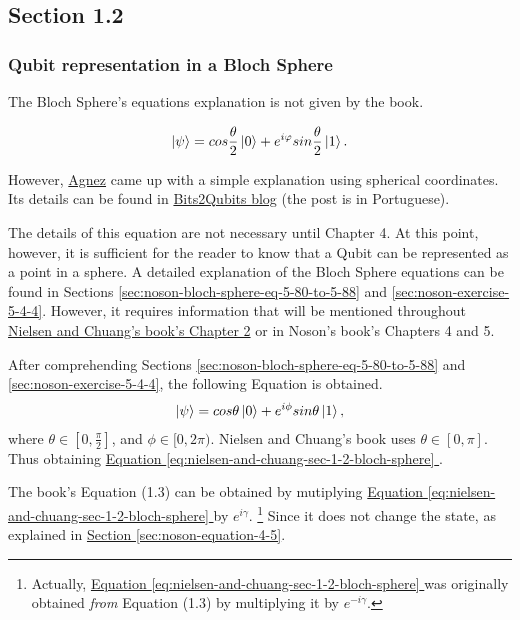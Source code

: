 \subsection{Section 1.2}
\subsubsection{Qubit representation in a Bloch Sphere}
\label{nielsen-and-chuang-qubit-representation-in-a-bloch-sphere}

The Bloch Sphere's equations explanation is not given by the book.

\begin{align}
\ket{\psi} = 
    cos \frac{\theta}{2}\ket{0} + e^{i \varphi} sin \frac{\theta}{2} \ket{1} .
    \label{eq:nielsen-and-chuang-sec-1-2-bloch-sphere}
\end{align}

However, \href{https://github.com/victoragnez}{Agnez} came up with a simple explanation using spherical coordinates.
Its details can be found in
\href{https://bits2qubits.blogspot.com/2018/09/representacao-de-qubits-na-esfera-de.html}{Bits2Qubits blog}
(the post is in Portuguese).

The details of this equation are not necessary until Chapter 4.
At this point, however, it is sufficient for the reader to know that
a Qubit can be represented as a point in a sphere.
A detailed explanation of the Bloch Sphere equations can be found in Sections
\hyperref[sec:noson-bloch-sphere-eq-5-80-to-5-88]{ \ref{sec:noson-bloch-sphere-eq-5-80-to-5-88}} and
\hyperref[sec:noson-exercise-5-4-4]{\ref{sec:noson-exercise-5-4-4}}.
However, it requires information that will be mentioned throughout
\hyperref[sec:nielsen-and-chuang-chapter-2]{Nielsen and Chuang's book's Chapter 2}
or in Noson's book's Chapters 4 and 5.

After comprehending Sections
\hyperref[sec:noson-bloch-sphere-eq-5-80-to-5-88]{ \ref{sec:noson-bloch-sphere-eq-5-80-to-5-88}} and
\hyperref[sec:noson-exercise-5-4-4]{\ref{sec:noson-exercise-5-4-4}},
the following Equation is obtained.
\begin{align}
    \ket\psi = cos\theta \ket0 + e^{i\phi} sin\theta \ket1,
\end{align}
where $\theta \in [0, \frac \pi 2]$, and $\phi \in [0, 2\pi)$.
Nielsen and Chuang's book uses $\theta \in [0, \pi]$.
Thus obtaining \hyperref[eq:nielsen-and-chuang-sec-1-2-bloch-sphere]{
    Equation \ref{eq:nielsen-and-chuang-sec-1-2-bloch-sphere}
}.

The book's Equation (1.3) can be obtained by mutiplying \hyperref[eq:nielsen-and-chuang-sec-1-2-bloch-sphere]{
    Equation \ref{eq:nielsen-and-chuang-sec-1-2-bloch-sphere}
} by $e^{i\gamma}$.
    \footnote{Actually, \hyperref[eq:nielsen-and-chuang-sec-1-2-bloch-sphere]{
        Equation \ref{eq:nielsen-and-chuang-sec-1-2-bloch-sphere}
        }
    was originally obtained \emph{from} Equation (1.3) by multiplying it by $e^{-i\gamma}$.
    }
Since it does not change the state,
as explained in \hyperref[sec:noson-equation-4-5]{Section \ref{sec:noson-equation-4-5}}.